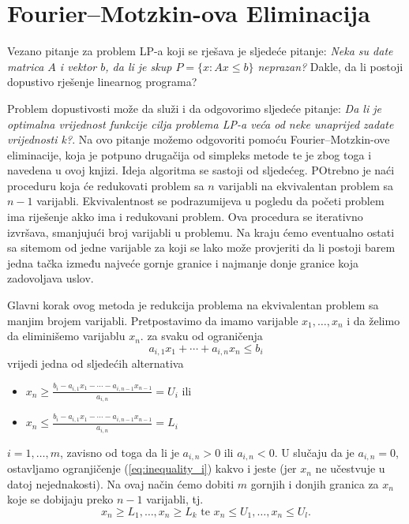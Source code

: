 \documentclass[a4paper, utf8, 11pt, colorlinks]{book}
\begin{document}
\section{Fourier–Motzkin-ova Eliminacija}
Vezano pitanje za problem  LP-a koji se rješava  je sljedeće pitanje:
\emph{Neka su date matrica $A$ i vektor $b$, da li je skup $P = \{x: A x \leq b\}$ neprazan?} Dakle, da li postoji dopustivo rješenje linearnog programa? 

Problem dopustivosti može da služi i da odgovorimo sljedeće pitanje: 
\emph{Da li je optimalna vrijednost funkcije cilja problema LP-a veća od neke unaprijed zadate  vrijednosti k?}.
 Na ovo pitanje možemo odgovoriti pomoću Fourier–Motzkin-ove eliminacije, koja je potpuno drugačija od simpleks metode te je zbog toga i navedena u ovoj knjizi. Ideja algoritma se sastoji od sljedećeg. POtrebno je naći proceduru koja će redukovati problem sa $n$ varijabli na ekvivalentan problem sa $n-1$ varijabli. Ekvivalentnost se podrazumijeva u pogledu da početi problem ima riješenje akko ima i redukovani problem. Ova procedura se iterativno izvršava, smanjujući broj varijabli u problemu. Na kraju ćemo eventualno ostati sa sitemom od jedne varijable za koji se lako može provjeriti da li postoji barem jedna tačka između najveće gornje granice i najmanje donje granice koja zadovoljava uslov. 
 
 Glavni korak ovog metoda je redukcija problema na ekvivalentan problem sa manjim brojem varijabli. Pretpostavimo da imamo varijable $x_1,\ldots, x_n$ i da želimo da eliminišemo varijablu $x_n$. za svaku od ograničenja
 \begin{equation}\label{eq:inequality_i}
      a_{i,1} x_1 + \cdots + a_{i,n} x_n \leq b_i
 \end{equation}
 vrijedi jedna od sljedećih alternativa 
 \begin{itemize}
 	 \item  $x_n \geq \frac{b_i - a_{i,1}x_1- \cdots - a_{i, n-1} x_{n-1} }{a_{i,n}}=U_i$ ili 
 	 \item   $x_n \leq \frac{b_i - a_{i,1}x_1- \cdots - a_{i, n-1} x_{n-1} }{a_{i,n}}=L_i$
 \end{itemize}
 $i=1,\ldots, m$, zavisno od toga da li je $a_{i,n} >0$ ili $a_{i,n} <0$. U slučaju da je $a_{i,n} = 0$,  ostavljamo  ogranjičenje (\ref{eq:inequality_i}) kakvo i jeste (jer $x_n$ ne učestvuje u datoj nejednakosti). Na ovaj način ćemo dobiti $m$ gornjih i donjih granica za $x_n$ koje se dobijaju preko $n-1$ varijabli, tj. 
 $$  x_n \geq L_1, \ldots, x_n\geq L_k \mbox{ te }  x_n \leq U_1, \ldots, x_n \leq U_l.$$
  
\end{document}
